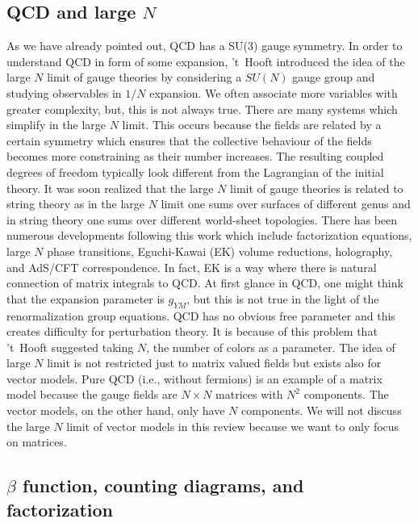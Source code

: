 \documentclass[11pt]{article}
\begin{document}
\subsection{QCD and large $N$} 
As we have already pointed out, QCD has a SU(3) gauge symmetry. 
In order to understand QCD in form of some expansion, 't~Hooft introduced 
the idea of the large $N$ limit of gauge theories by considering a $SU(N)$ gauge group
and studying observables in $1/N$ expansion. We often associate more variables with greater complexity, but, 
this is not always true. There are many systems which simplify in the large $N$ limit. 
This occurs because the fields are related by a certain
symmetry which ensures that the collective behaviour of the fields becomes more constraining 
as their number increases. The resulting
coupled degrees of freedom typically look different from the Lagrangian of the initial theory. 
It was soon realized that the large $N$ limit of gauge theories is related to string theory 
as in the large $N$ limit one sums over surfaces of different genus and in 
string theory one sums over different world-sheet topologies. 
There has been numerous developments following this work which 
include factorization equations, large $N$ phase transitions, 
Eguchi-Kawai (EK) volume reductions, holography, and AdS/CFT correspondence. 
In fact, EK is a way where there is natural connection of matrix integrals to QCD. 
 At first glance in QCD, one might think that the expansion parameter is $g_{YM}$, but this is not 
true in the light of the renormalization group equations. QCD has no obvious free parameter and this creates difficulty for
perturbation theory. It is because of this problem that 't~Hooft suggested taking $N$, 
the number of colors as a parameter. The idea of large $N$ limit is not restricted just to matrix valued fields 
but exists also for vector models. Pure QCD (i.e., without fermions) 
is an example of a matrix model because the gauge fields are 
$N \times N$ matrices with $N^2$ components. 
The vector models, on the other hand, only have $N$ components. We will not discuss the 
large $N$ limit of vector models in this review because we want to only focus on matrices. 

\subsection{$\beta$ function, counting diagrams, and factorization} 
\end{document}
